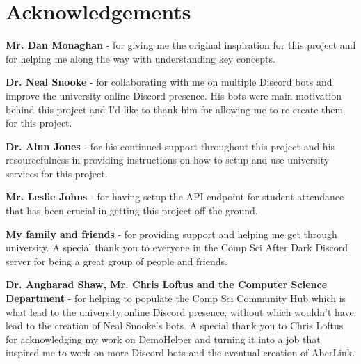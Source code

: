 \thispagestyle{empty}


\section*{\centering Acknowledgements}

\textbf{Mr. Dan Monaghan} - for giving me the original inspiration for this project and for helping me along the way with understanding key concepts. 

\textbf{Dr. Neal Snooke} - for collaborating with me on multiple Discord bots and improve the university online Discord presence. His bots were main motivation behind this project and I'd like to thank him for allowing me to re-create them for this project.

\textbf{Dr. Alun Jones} - for his continued support throughout this project and his resourcefulness in providing instructions on how to setup and use  university services for this project.

\textbf{Mr. Leslie Johns} - for having setup the API endpoint for student attendance that has been crucial in getting this project off the ground.

\textbf{My family and friends} - for providing support and helping me get through university. A special thank you to everyone in the Comp Sci After Dark Discord server for being a great group of people and friends. 

\textbf{Dr. Angharad Shaw, Mr. Chris Loftus and the Computer Science Department} - for helping to populate the Comp Sci Community Hub which is what lead to the university online Discord presence, without which wouldn't have lead to the creation of Neal Snooke's bots. A special thank you to Chris Loftus for acknowledging my work on DemoHelper and turning it into a job that inspired me to work on more Discord bots and the eventual creation of AberLink.
